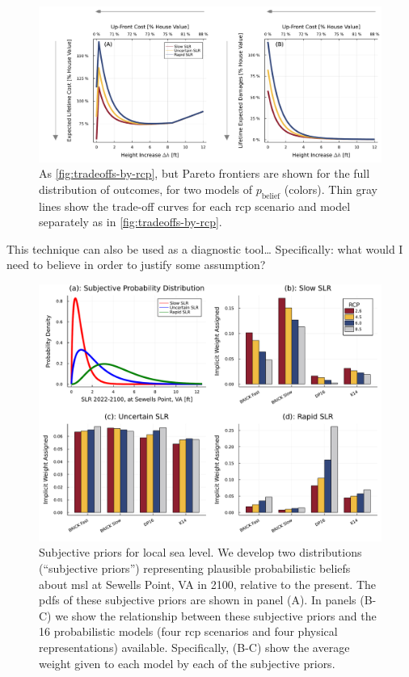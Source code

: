 \documentclass[11pt]{article}
\newcommand{\james}[1]{\todo[color=giallo, textcolor=nero]{\textbf{ATTN James:~}#1}} %
\begin{document}
\begin{figure}
    \centering
    \includegraphics[width=\textwidth]{tradeoffs-by-prior}
    \caption{
        As \cref{fig:tradeoffs-by-rcp}, but Pareto frontiers are shown for the full distribution of outcomes, for two models of $p_\text{belief}$ (colors).
        Thin gray lines show the trade-off curves for each \gls{rcp} scenario and model separately as in \cref{fig:tradeoffs-by-rcp}.
    }\label{fig:tradeoffs-by-prior}
\end{figure}

This technique can also be used as a diagnostic tool\ldots\james{To do}
Specifically: what would I need to believe in order to justify some assumption?

\begin{figure}
    \centering
    \includegraphics[width=\textwidth]{lsl-priors-weights}
    \caption{
        Subjective priors for local sea level.
        We develop two distributions (``subjective priors'') representing plausible probabilistic beliefs about \gls{msl} at Sewells Point, VA in 2100, relative to the present.
        The \glspl{pdf} of these subjective priors are shown in panel (A).
        In panels (B-C) we show the relationship between these subjective priors and the 16 probabilistic models (four \gls{rcp} scenarios and four physical representations) available.
        Specifically, (B-C) show the average weight given to each model by each of the subjective priors.
    }\label{fig:lsl-priors-weights}
\end{figure}
\end{document}
